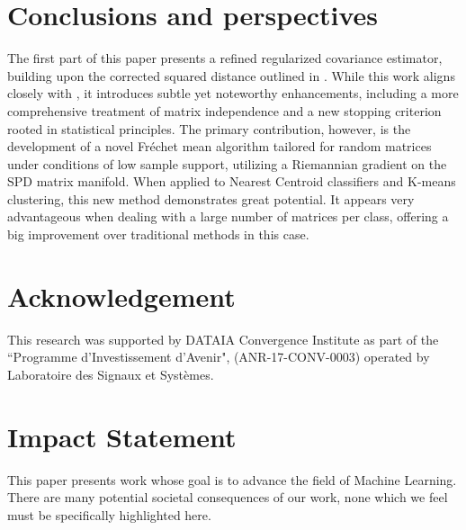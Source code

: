 \documentclass{article}
\theoremstyle{plain}
\theoremstyle{definition}
\theoremstyle{remark}
\begin{document}
\section{Conclusions and perspectives}
\label{sec:conclusion}


The first part of this paper presents a refined regularized covariance estimator, building upon the corrected squared distance outlined in \cite{couillet2019random}. While this work aligns closely with \cite{tiomoko2019random}, it introduces subtle yet noteworthy enhancements, including a more comprehensive treatment of matrix independence and a new stopping criterion rooted in statistical principles. The primary contribution, however, is the development of a novel Fréchet mean algorithm tailored for random matrices under conditions of low sample support, utilizing a Riemannian gradient on the SPD matrix manifold. When applied to Nearest Centroid classifiers and K-means clustering, this new method demonstrates great potential. It appears very advantageous when dealing with a large number of matrices per class, offering a big improvement over traditional methods in this case.



\section*{Acknowledgement}
This research was supported by DATAIA Convergence Institute as part of the ``Programme d’Investissement d’Avenir", (ANR-17-CONV-0003) operated by Laboratoire des Signaux et Systèmes.


\section*{Impact Statement}
This paper presents work whose goal is to advance the field of Machine Learning. There are many potential societal consequences of our work, none which we feel must be specifically highlighted here.
\end{document}
